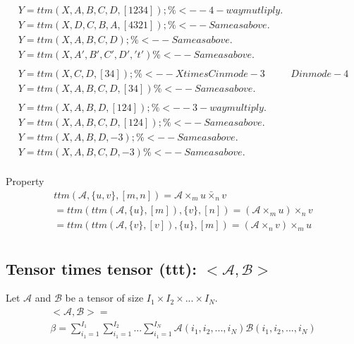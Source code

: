 \documentclass{Note}
\begin{document}
\begin{equation}
\begin{aligned}
Y = ttm(X, {A,B,C,D}, [1 2 3 4]); \%<-- 4-way mutliply.\\
Y = ttm(X, {D,C,B,A}, [4 3 2 1]); \%<-- Same as above.\\
Y = ttm(X, {A,B,C,D});            \%<-- Same as above.\\
Y = ttm(X, {A',B',C',D'}, 't')    \%<-- Same as above.\\
\\
Y = ttm(X, {C,D}, [3 4]);    \%<-- X times C in mode-3 & D in mode-4\\
Y = ttm(X, {A,B,C,D}, [3 4]) \%<-- Same as above.\\
\\
Y = ttm(X, {A,B,D}, [1 2 4]);  \%<-- 3-way multiply.\\
Y = ttm(X, {A,B,C,D}, [1 2 4]); \%<-- Same as above.\\
Y = ttm(X, {A,B,D}, -3);        \%<-- Same as above.\\
Y = ttm(X, {A,B,C,D}, -3)       \%<-- Same as above.\\
\end{aligned}
\end{equation}


Property
\begin{equation}
\begin{aligned}
ttm(\mathcal{A},\{u,v\},[m,n])=\mathcal{A}{\times}_m u \bar{\times}_n v\\
=ttm(ttm(\mathcal{A},\{u\},[m]),\{v\},[n])=(\mathcal{A}{\times}_m u ){\times}_{n} v\\
=ttm(ttm(\mathcal{A},\{v\},[v]),\{u\},[m])=(\mathcal{A}{\times}_n v ) {\times}_{m} u\\
\end{aligned}
\end{equation}


\subsection{Tensor times tensor (ttt): $<\mathcal{A},\mathcal{B}>$}
Let $\mathcal{A}$ and $\mathcal{B}$ be a tensor of size $I_1\times I_2\times ...\times I_N$.
\begin{equation}
\begin{aligned}
<\mathcal{A},\mathcal{B}>=\\
\beta=\sum_{i_1=1}^{I_1}\sum_{i_1=1}^{I_2}...\sum_{i_1=1}^{I_N}\mathcal{A}(i_1,i_2,...,i_N)\mathcal{B}(i_1,i_2,...,i_N)
\end{aligned}
\end{equation}
\end{document}
